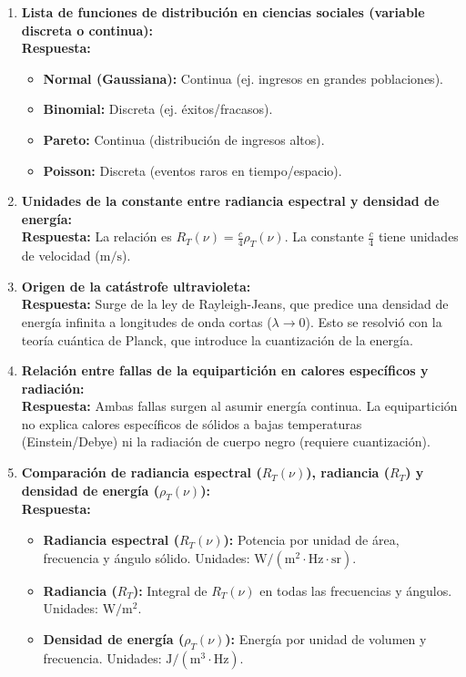 \documentclass{article}
\begin{document}
\begin{enumerate}[leftmargin=*]
\item \textbf{Lista de funciones de distribución en ciencias sociales (variable discreta o continua):} \\
\textbf{Respuesta:}
\begin{itemize}
    \item \textbf{Normal (Gaussiana):} Continua (ej. ingresos en grandes poblaciones).
    \item \textbf{Binomial:} Discreta (ej. éxitos/fracasos).
    \item \textbf{Pareto:} Continua (distribución de ingresos altos).
    \item \textbf{Poisson:} Discreta (eventos raros en tiempo/espacio).
\end{itemize}

\item \textbf{Unidades de la constante entre radiancia espectral y densidad de energía:} \\
\textbf{Respuesta:} La relación es \( R_T(\nu) = \frac{c}{4} \rho_T(\nu) \). La constante \( \frac{c}{4} \) tiene unidades de velocidad (\( \text{m/s} \)).

\item \textbf{Origen de la catástrofe ultravioleta:} \\
\textbf{Respuesta:} Surge de la ley de Rayleigh-Jeans, que predice una densidad de energía infinita a longitudes de onda cortas (\(\lambda \to 0\)). Esto se resolvió con la teoría cuántica de Planck, que introduce la cuantización de la energía.

\item \textbf{Relación entre fallas de la equipartición en calores específicos y radiación:} \\
\textbf{Respuesta:} Ambas fallas surgen al asumir energía continua. La equipartición no explica calores específicos de sólidos a bajas temperaturas (Einstein/Debye) ni la radiación de cuerpo negro (requiere cuantización).

\item \textbf{Comparación de radiancia espectral (\( R_T(\nu) \)), radiancia (\( R_T \)) y densidad de energía (\( \rho_T(\nu) \)):} \\
\textbf{Respuesta:}
\begin{itemize}
    \item \textbf{Radiancia espectral (\( R_T(\nu) \)):} Potencia por unidad de área, frecuencia y ángulo sólido. Unidades: \( \text{W}/(\text{m}^2 \cdot \text{Hz} \cdot \text{sr}) \).
    \item \textbf{Radiancia (\( R_T \)):} Integral de \( R_T(\nu) \) en todas las frecuencias y ángulos. Unidades: \( \text{W}/\text{m}^2 \).
    \item \textbf{Densidad de energía (\( \rho_T(\nu) \)):} Energía por unidad de volumen y frecuencia. Unidades: \( \text{J}/(\text{m}^3 \cdot \text{Hz}) \).
\end{itemize}



\end{enumerate}
\end{document}

